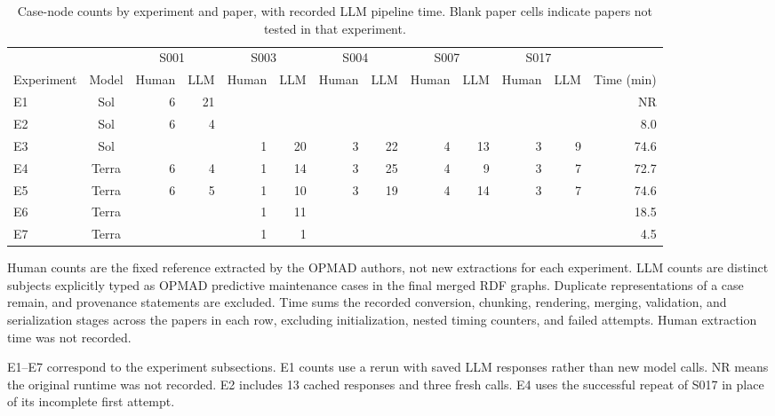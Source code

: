 \documentclass[journal]{IEEEtran}
\begin{document}
\begin{table}[!b]
\centering
\caption{Case-node counts by experiment and paper, with recorded LLM pipeline time. Blank paper cells indicate papers not tested in that experiment.}
\label{tab:comparison}
\footnotesize
\setlength{\tabcolsep}{5pt}
\begin{tabular}{@{}lc*{10}{r}r@{}}
\toprule
 & & \multicolumn{2}{c}{S001~\cite{lu2019}} & \multicolumn{2}{c}{S003~\cite{vafaei2019}} & \multicolumn{2}{c}{S004~\cite{wu2016}} & \multicolumn{2}{c}{S007~\cite{hussain2015}} & \multicolumn{2}{c}{S017~\cite{ren2018}} & \\
\cmidrule(lr){3-4}\cmidrule(lr){5-6}\cmidrule(lr){7-8}\cmidrule(lr){9-10}\cmidrule(lr){11-12}
Experiment & Model & Human & LLM & Human & LLM & Human & LLM & Human & LLM & Human & LLM & Time (min) \\
\midrule
E1 & Sol   & 6 & 21 &   &    &   &    &   &    &   &   & NR \\
E2 & Sol   & 6 &  4 &   &    &   &    &   &    &   &   & 8.0 \\
E3 & Sol   &   &    & 1 & 20 & 3 & 22 & 4 & 13 & 3 & 9 & 74.6 \\
E4 & Terra & 6 &  4 & 1 & 14 & 3 & 25 & 4 &  9 & 3 & 7 & 72.7 \\
E5 & Terra & 6 &  5 & 1 & 10 & 3 & 19 & 4 & 14 & 3 & 7 & 74.6 \\
E6 & Terra &   &    & 1 & 11 &   &    &   &    &   &   & 18.5 \\
E7 & Terra &   &    & 1 &  1 &   &    &   &    &   &   & 4.5 \\
\bottomrule
\end{tabular}
\par\smallskip
\begin{minipage}{\textwidth}
\footnotesize
Human counts are the fixed reference extracted by the OPMAD authors, not new extractions for each experiment. LLM counts are distinct subjects explicitly typed as OPMAD predictive maintenance cases in the final merged RDF graphs. Duplicate representations of a case remain, and provenance statements are excluded. Time sums the recorded conversion, chunking, rendering, merging, validation, and serialization stages across the papers in each row, excluding initialization, nested timing counters, and failed attempts. Human extraction time was not recorded.
\par\smallskip
E1--E7 correspond to the experiment subsections. E1 counts use a rerun with saved LLM responses rather than new model calls. NR means the original runtime was not recorded. E2 includes 13 cached responses and three fresh calls. E4 uses the successful repeat of S017 in place of its incomplete first attempt.
\end{minipage}
\end{table}
\end{document}
